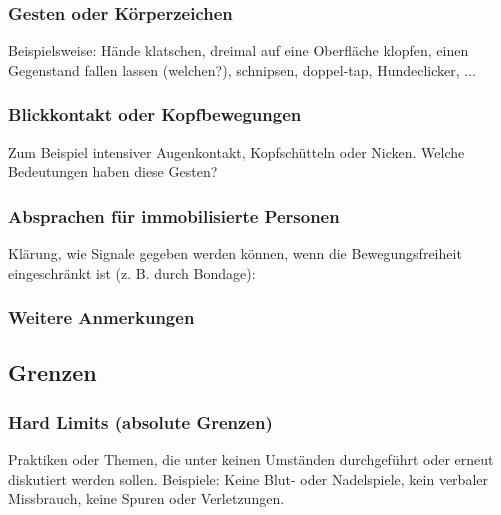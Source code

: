 \documentclass[a4paper,12pt]{article}
\begin{document}
\subsubsection{Gesten oder Körperzeichen}
\noindent Beispielsweise: Hände klatschen, dreimal auf eine Oberfläche klopfen, einen Gegenstand fallen lassen (welchen?), schnipsen, doppel-tap, Hundeclicker, ... \newline
\noindent \TextField[name=SafewordNonVerbal,multiline=true,height=8em, width=37em]{}

\subsubsection{Blickkontakt oder Kopfbewegungen}
\noindent Zum Beispiel intensiver Augenkontakt, Kopfschütteln oder Nicken. Welche Bedeutungen haben diese Gesten?\newline
\noindent \TextField[name=SafewordNonVerbalBlick,multiline=true,height=8em, width=37em]{}

\subsubsection{Absprachen für immobilisierte Personen}
\noindent Klärung, wie Signale gegeben werden können, wenn die Bewegungsfreiheit eingeschränkt ist (z. B. durch Bondage):\newline
\noindent \TextField[name=SafewordNonMobile,multiline=true,height=10em, width=37em]{}

\subsubsection{Weitere Anmerkungen}
\noindent \TextField[name=SafewordAnmerkungenNonVerbal,multiline=true,height=5em, width=37em]{}

\newpage
\subsection{Grenzen}
\subsubsection{Hard Limits (absolute Grenzen)}
\noindent Praktiken oder Themen, die unter keinen Umständen durchgeführt oder erneut diskutiert werden sollen. Beispiele: Keine Blut- oder Nadelspiele, kein verbaler Missbrauch, keine Spuren oder Verletzungen. \newline
\noindent \TextField[name=LimitsHard,multiline=true,height=15em, width=37em]{}
\end{document}
